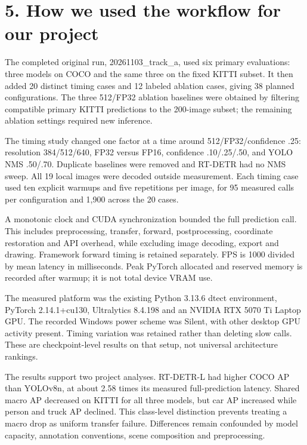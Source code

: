 \documentclass[10pt]{article}
\begin{document}
\section*{5. How we used the workflow for our project}
The completed original run, 20261103\_track\_a, used six primary evaluations: three models on COCO and the same three on the fixed KITTI subset. It then added 20 distinct timing cases and 12 labeled ablation cases, giving 38 planned configurations. The three 512/FP32 ablation baselines were obtained by filtering compatible primary KITTI predictions to the 200-image subset; the remaining ablation settings required new inference.


The timing study changed one factor at a time around 512/FP32/confidence .25: resolution 384/512/640, FP32 versus FP16, confidence .10/.25/.50, and YOLO NMS .50/.70. Duplicate baselines were removed and RT-DETR had no NMS sweep. All 19 local images were decoded outside measurement. Each timing case used ten explicit warmups and five repetitions per image, for 95 measured calls per configuration and 1,900 across the 20 cases.


A monotonic clock and CUDA synchronization bounded the full prediction call. This includes preprocessing, transfer, forward, postprocessing, coordinate restoration and API overhead, while excluding image decoding, export and drawing. Framework forward timing is retained separately. FPS is 1000 divided by mean latency in milliseconds. Peak PyTorch allocated and reserved memory is recorded after warmup; it is not total device VRAM use.


The measured platform was the existing Python 3.13.6 dtect environment, PyTorch 2.14.1+cu130, Ultralytics 8.4.198 and an NVIDIA RTX 5070 Ti Laptop GPU. The recorded Windows power scheme was Silent, with other desktop GPU activity present. Timing variation was retained rather than deleting slow calls. These are checkpoint-level results on that setup, not universal architecture rankings.


The results support two project analyses. RT-DETR-L had higher COCO AP than YOLOv8n, at about 2.58 times its measured full-prediction latency. Shared macro AP decreased on KITTI for all three models, but car AP increased while person and truck AP declined. This class-level distinction prevents treating a macro drop as uniform transfer failure. Differences remain confounded by model capacity, annotation conventions, scene composition and preprocessing.
\end{document}
